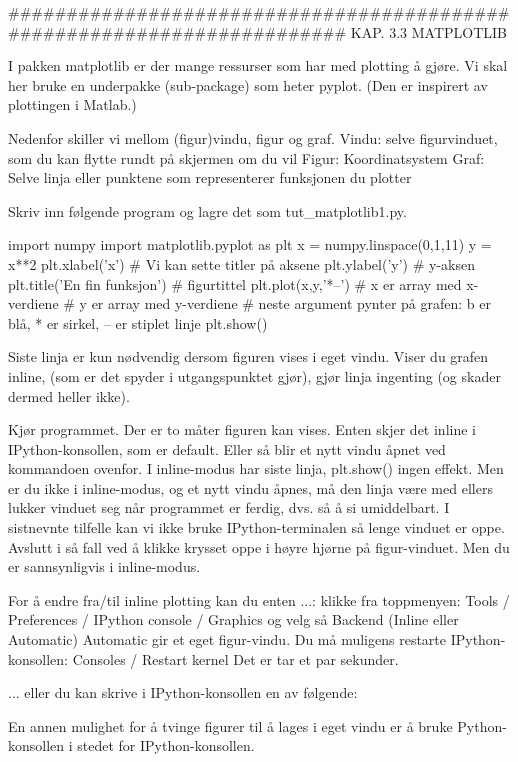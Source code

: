 ######################################################################## 
KAP. 3.3  MATPLOTLIB

I pakken matplotlib er der mange ressurser som har med plotting å gjøre.
Vi skal her bruke en underpakke (sub-package) som heter pyplot.
(Den er inspirert av plottingen i Matlab.)

Nedenfor skiller vi mellom (figur)vindu, figur og graf. 
  Vindu: selve figurvinduet, som du kan flytte rundt på skjermen om du vil 
  Figur: Koordinatsystem
  Graf:  Selve linja eller punktene som representerer funksjonen du plotter

Skriv inn følgende program og lagre det som tut_matplotlib1.py. 

import numpy 
import matplotlib.pyplot as plt 
x = numpy.linspace(0,1,11)
y = x**2
plt.xlabel('x')   # Vi kan sette titler på aksene
plt.ylabel('y')   # y-aksen
plt.title('En fin funksjon')    # figurtittel 
plt.plot(x,y,'*--') 
  # x er array med x-verdiene
  # y er array med y-verdiene
  # neste argument pynter på grafen: b er blå, * er sirkel, -- er stiplet linje
plt.show()   

Siste linja er kun nødvendig dersom figuren vises i eget vindu. 
Viser du grafen inline, (som er det spyder i utgangspunktet gjør), 
gjør linja ingenting (og skader dermed heller ikke). 

Kjør programmet. 
Der er to måter figuren kan vises.
Enten skjer det inline i IPython-konsollen, som er default. 
Eller så blir et nytt vindu åpnet ved kommandoen ovenfor. 
I inline-modus har siste linja, plt.show() ingen effekt. 
Men er du ikke i inline-modus, og et nytt vindu åpnes, må den linja være med 
ellers lukker vinduet seg når programmet er ferdig, dvs. så å si umiddelbart.  
I sistnevnte tilfelle kan vi ikke bruke IPython-terminalen så lenge vinduet er oppe. 
Avslutt i så fall ved å klikke krysset oppe i høyre hjørne på figur-vinduet. 
Men du er sannsynligvis i inline-modus. 

For å endre fra/til inline plotting kan du enten ...:
klikke fra toppmenyen: 
Tools / Preferences / IPython console / Graphics
og velg så Backend (Inline eller Automatic) 
Automatic gir et eget figur-vindu.
Du må muligens restarte IPython-konsollen: Consoles / Restart kernel
Det er tar et par sekunder.

... eller du kan skrive i IPython-konsollen en av følgende: 


En annen mulighet for å tvinge figurer til å lages i eget vindu er å bruke 
Python-konsollen i stedet for IPython-konsollen. 

